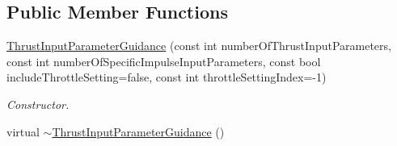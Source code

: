 \subsection*{Public Member Functions}
\begin{DoxyCompactItemize}
\item 
\hyperlink{classtudat_1_1simulation__setup_1_1ThrustInputParameterGuidance_a3e4ab4fa35c3952998f4612b77cff06a}{Thrust\+Input\+Parameter\+Guidance} (const int number\+Of\+Thrust\+Input\+Parameters, const int number\+Of\+Specific\+Impulse\+Input\+Parameters, const bool include\+Throttle\+Setting=false, const int throttle\+Setting\+Index=-\/1)
\begin{DoxyCompactList}\small\item\em Constructor. \end{DoxyCompactList}\item 
virtual \hyperlink{classtudat_1_1simulation__setup_1_1ThrustInputParameterGuidance_a77b3fb63c4a7fd2b09d4ad17e4559cb4}{$\sim$\+Thrust\+Input\+Parameter\+Guidance} ()\hypertarget{classtudat_1_1simulation__setup_1_1ThrustInputParameterGuidance_a77b3fb63c4a7fd2b09d4ad17e4559cb4}{}\label{classtudat_1_1simulation__setup_1_1ThrustInputParameterGuidance_a77b3fb63c4a7fd2b09d4ad17e4559cb4}


\end{DoxyCompactItemize}
